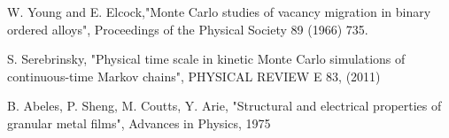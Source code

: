 \begin{thebibliography}{10}
 W. Young and E. Elcock,"Monte Carlo studies of vacancy migration in binary ordered alloys", Proceedings of the Physical Society 89 (1966) 735.

 S. Serebrinsky, "Physical time scale in kinetic Monte Carlo simulations of continuous-time Markov chains", PHYSICAL REVIEW E 83, (2011)

 B. Abeles, P. Sheng, M. Coutts, Y. Arie, "Structural and electrical properties of granular metal films", Advances in Physics, 1975

\end{thebibliography}
